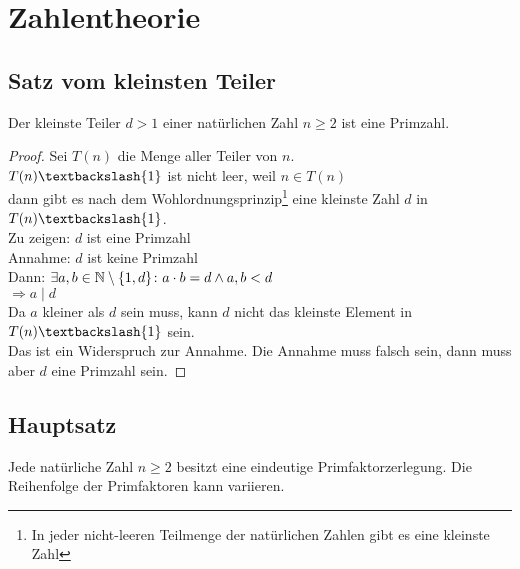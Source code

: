 \section{Zahlentheorie}
\subsection{Satz vom kleinsten Teiler}
Der kleinste Teiler $d > 1$ einer natürlichen Zahl $n \geq 2$ ist eine Primzahl.

\begin{proof}
	Sei $T(n)$ die Menge aller Teiler von $n$.\\
	$T(n)\textbackslash\{1\}$ ist nicht leer, weil $n \in T(n)$\\
	dann gibt es nach dem Wohlordnungsprinzip\footnote{In jeder nicht-leeren Teilmenge der natürlichen Zahlen gibt es eine kleinste Zahl} 
	eine kleinste Zahl $d$ in $T(n)\textbackslash\{1\}$.\\
	Zu zeigen: $d$ ist eine Primzahl\\
	Annahme: $d$ ist keine Primzahl\\
	Dann: $\exists a, b \in \mathbb{N} \setminus\{1, d\} \colon a \cdot b = d \wedge a, b < d$\\
	$\Rightarrow a \mid d$\\
	Da $a$ kleiner als $d$ sein muss, kann $d$ nicht das kleinste Element in $T(n)\textbackslash{1}$ sein.\\
	Das ist ein Widerspruch zur Annahme. Die Annahme muss falsch sein, dann muss aber $d$ eine Primzahl sein.
	\qedhere
\end{proof}

\subsection{Hauptsatz}
Jede natürliche Zahl $n \geq 2$ besitzt eine eindeutige Primfaktorzerlegung.
Die Reihenfolge der Primfaktoren kann variieren.

